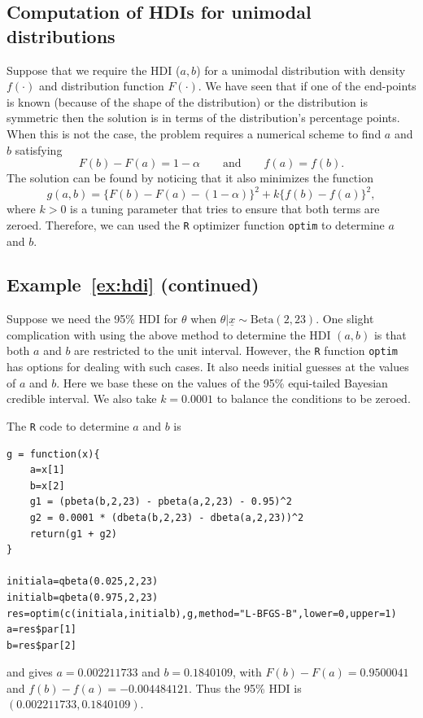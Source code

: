 {\subsection*{Computation of HDIs for unimodal distributions}
Suppose that we require the HDI ($a,b$) for a unimodal distribution
with density $f(\cdot)$ and distribution function $F(\cdot)$.  We have
seen that if one of the end-points is known (because of the shape of
the distribution) or the distribution is symmetric then the solution
is in terms of the distribution's percentage points. When this is not
the case, the problem requires a numerical scheme to find $a$ and
$b$ satisfying
$$
F(b)-F(a)=1-\alpha \quad\quad\text{and}\quad\quad f(a)=f(b).
$$
The solution can be found by noticing that it also minimizes the
function
$$
g(a,b)=\bigl\{F(b)-F(a)-(1-\alpha)\bigr\}^2+k\bigl\{f(b)-f(a)\bigr\}^2,
$$
where $k>0$ is a tuning parameter that tries to ensure that both terms
are zeroed.  Therefore, we can used the \texttt{R} optimizer function
\texttt{optim} to determine $a$ and $b$.

\subsection*{Example~\ref{ex:hdi} (continued)}
Suppose we need the 95\% HDI for $\theta$ when $\theta|\underline{x}\sim \mathrm{Beta}(2,23)$. One slight complication with using the above method to determine the HDI $(a,b)$ is that both $a$ and $b$ are restricted to the unit interval. However, the \texttt{R} function \texttt{optim} has options for dealing with such cases. It also needs initial guesses at the values of $a$ and $b$. Here we base these on the values of the 95\% equi-tailed Bayesian credible interval. We also take $k=0.0001$ to balance the conditions to be zeroed.

The \texttt{R} code to determine $a$ and $b$ is 
\begin{verbatim}
g = function(x){
    a=x[1]
    b=x[2]
    g1 = (pbeta(b,2,23) - pbeta(a,2,23) - 0.95)^2
    g2 = 0.0001 * (dbeta(b,2,23) - dbeta(a,2,23))^2
    return(g1 + g2)
}

initiala=qbeta(0.025,2,23)
initialb=qbeta(0.975,2,23)
res=optim(c(initiala,initialb),g,method="L-BFGS-B",lower=0,upper=1)
a=res$par[1] 
b=res$par[2]
\end{verbatim}
and gives $a=0.002211733$ and $b=0.1840109$, with $F(b)-F(a)=0.9500041$ and $f(b)-f(a)=-0.004484121$. Thus the 95\% HDI is $(0.002211733,0.1840109)$.}




